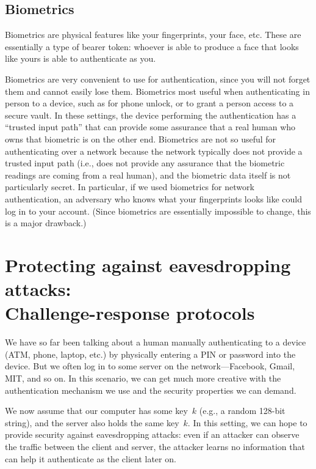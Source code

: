 \subsection{Biometrics}
Biometrics are physical features like your fingerprints, your face, etc.
These are essentially a type of bearer token: whoever is able to produce a face
that looks like yours is able to authenticate as you.

Biometrics are very convenient to use for
authentication, since you will not forget them and
cannot easily lose them.
Biometrics most useful when authenticating in
person to a device, such as for phone unlock, or
to grant a person access to a secure vault.
In these settings, the device performing the authentication has a ``trusted input path''
that can provide some assurance that a real human who owns that biometric is on the other end.
Biometrics are not so useful for authenticating over a network because the network typically
does not provide a trusted input path (i.e., does not provide any assurance that the biometric
readings are coming from a real human), and the biometric data itself is not particularly secret.
In particular, if we used biometrics for network authentication,
an adversary who knows what your fingerprints looks like could log in to your account.
(Since biometrics are essentially impossible to change, this is a major drawback.)

\section{Protecting against eavesdropping attacks:\\
Challenge-response protocols}

We have so far been talking about a human manually
authenticating to a device (ATM, phone, laptop, etc.)
by physically entering a PIN or password into the device.
But we often log in to some server on the network---Facebook,
Gmail, MIT, and so on. 
In this scenario, we can get much more creative
with the authentication mechanism we use and the
security properties we can demand.

We now assume that our computer has some key~$k$
(e.g., a random 128-bit string), 
and the server also holds the same key~$k$. 
In this setting, we can hope to provide security against
eavesdropping attacks: even if an attacker can observe
the traffic between the client and server, the attacker
learns no information that can help it authenticate as
the client later on.

